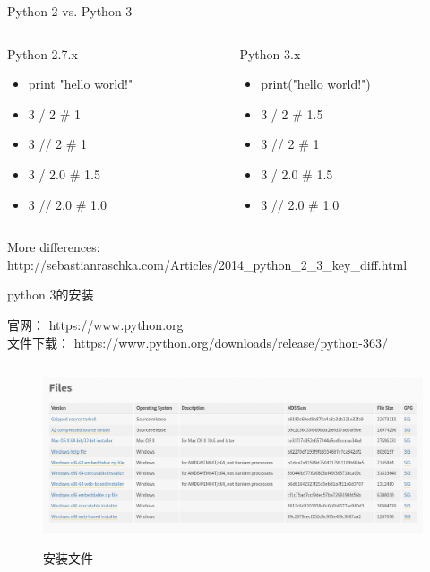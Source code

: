 \documentclass[aspectratio=169]{beamer}
\begin{document}
    \begin{frame}{Python 2 vs. Python 3}
      \begin{columns}
      \begin{column}[t]{0.5\textwidth}
        Python 2.7.x
        \begin{itemize}
          \item print "hello world!"
          \item 3 / 2 \# 1
          \item 3 // 2 \# 1
          \item 3 / 2.0 \# 1.5
          \item 3 // 2.0 \# 1.0
        \end{itemize}
      \end{column}

      \begin{column}[t]{0.5\textwidth}
        Python 3.x
        \begin{itemize}
          \item print("hello world!")
          \item 3 / 2 \# 1.5
          \item 3 // 2 \# 1
          \item 3 / 2.0 \# 1.5
          \item 3 // 2.0 \# 1.0
        \end{itemize}
      \end{column}

      \end{columns}
      More differences: http://sebastianraschka.com/Articles/2014\_python\_2\_3\_key\_diff.html
      
    \end{frame}

    \begin{frame}{python 3的安装}
      
      官网： https://www.python.org \\
      文件下载： https://www.python.org/downloads/release/python-363/

      \begin{figure}
      \includegraphics[height=5.35cm, width=13cm]{install-python.png}
      \caption{安装文件}
      \end{figure}
    \end{frame}
\end{document}
